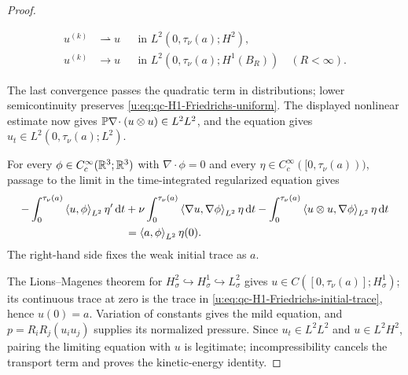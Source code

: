 \begin{proof}
\begin{samepage}
\begin{align*}
 u^{(k)}&\rightharpoonup u
 &&\text{in }L^2(0,\tau_\nu(a);H^2),\\
 u^{(k)}&\longrightarrow u
 &&\text{in }L^2(0,\tau_\nu(a);H^1(B_R))
 \quad(R<\infty).
\end{align*}
\par
\end{samepage}
The last convergence passes the quadratic term in distributions; lower
semicontinuity preserves \eqref{u:eq:qc-H1-Friedrichs-uniform}.  The displayed
nonlinear estimate now gives
\(\mathbb P\nabla\!\cdot(u\otimes u)\in L^2L^2\), and the equation gives
\(u_t\in L^2(0,\tau_\nu(a);L^2)\).
\begin{samepage}
For every
\(\phi\in C_c^\infty(\mathbb R^3;\mathbb R^3)\) with \(\nabla\cdot\phi=0\) and every
\(\eta\in C_c^\infty([0,\tau_\nu(a)))\), passage to the limit in the
time-integrated regularized equation gives
\begin{align}
 -\int_0^{\tau_\nu(a)}\left\langle u,\phi\right\rangle_{L^2}\eta'\,\mathrm d t
 &+\nu\int_0^{\tau_\nu(a)}\left\langle \nabla u,\nabla\phi\right\rangle_{L^2}\eta\,\mathrm d t
 -\int_0^{\tau_\nu(a)}\left\langle u\otimes u,\nabla\phi\right\rangle_{L^2}\eta\,\mathrm d t
 \notag\\
 &=\left\langle a,\phi\right\rangle_{L^2}\eta(0).
 \label{u:eq:qc-H1-Friedrichs-initial-trace}
\end{align}
The right-hand side fixes the weak initial trace as \(a\).
\par
\end{samepage}
The Lions--Magenes theorem \cite{LionsMagenes1972} for
\(H^2_\sigma\hookrightarrow H^1_\sigma\hookrightarrow L^2_\sigma\)
gives \(u\in C([0,\tau_\nu(a)];H^1_\sigma)\); its continuous trace at zero is
the trace in \eqref{u:eq:qc-H1-Friedrichs-initial-trace}, hence \(u(0)=a\).
Variation of constants gives the mild equation, and
\(p=R_iR_j(u_i u_j)\) supplies its normalized pressure.  Since
\(u_t\in L^2L^2\) and \(u\in L^2H^2\), pairing the limiting equation with
\(u\) is legitimate; incompressibility cancels the transport term and proves
the kinetic-energy identity.


\end{proof}
